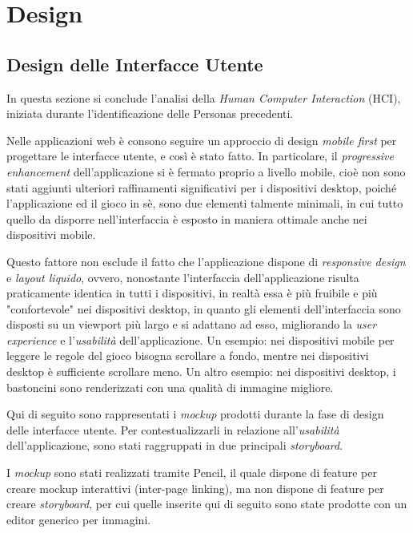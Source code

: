 \section{Design}

\subsection{Design delle Interfacce Utente}
\label{design delle interfacce utente}

In questa sezione si conclude l'analisi della \emph{Human Computer Interaction} (HCI), iniziata durante l'identificazione delle Personas precedenti.

Nelle applicazioni web è consono seguire un approccio di design \emph{mobile first} per progettare le interfacce utente, e così è stato fatto. In particolare, il \emph{progressive enhancement} dell'applicazione si è fermato proprio a livello mobile, cioè non sono stati aggiunti ulteriori raffinamenti significativi per i dispositivi desktop, poiché l'applicazione ed il gioco in sè, sono due elementi talmente minimali, in cui tutto quello da disporre nell'interfaccia è esposto in maniera ottimale anche nei dispositivi mobile.

Questo fattore non esclude il fatto che l'applicazione dispone di \emph{responsive design} e \emph{layout liquido}, ovvero, nonostante l'interfaccia dell'applicazione risulta praticamente identica in tutti i dispositivi, in realtà essa è più fruibile e più "confortevole" nei dispositivi desktop, in quanto gli elementi dell'interfaccia sono disposti su un viewport più largo e si adattano ad esso, migliorando la \emph{user experience} e l'\emph{usabilità} dell'applicazione. Un esempio: nei dispositivi mobile per leggere le regole del gioco bisogna scrollare a fondo, mentre nei dispositivi desktop è sufficiente scrollare meno. Un altro esempio: nei dispositivi desktop, i bastoncini sono renderizzati con una qualità di immagine migliore.

Qui di seguito sono rappresentati i \emph{mockup} prodotti durante la fase di design delle interfacce utente. Per contestualizzarli in relazione all'\emph{usabilità} dell'applicazione, sono stati raggruppati in due principali \emph{storyboard}.

I \emph{mockup} sono stati realizzati tramite Pencil, il quale dispone di feature per creare mockup interattivi (inter-page linking\cite{pencil_website}), ma non dispone di feature per creare \emph{storyboard}, per cui quelle inserite qui di seguito sono state prodotte con un editor generico per immagini.

